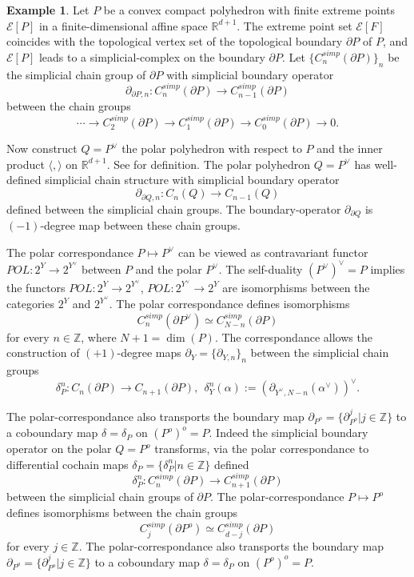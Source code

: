 \documentclass[12pt]{amsart}
\theoremstyle{definition}
\newtheorem{exx}{Example}
\theoremstyle{remark}
\newcommand{\bR}{\mathbb{R}}
\newcommand{\bZ}{\mathbb{Z}}
\newcommand{\del}{\partial}
\newcommand{\sE}{\mathscr{E}}
\begin{document}
\begin{exx}
Let $P$ be a convex compact polyhedron with finite extreme points $\sE[P]$ in a finite-dimensional affine space $\bR^{d+1}$. The extreme point set $\sE[F]$ coincides with the topological vertex set of the topological boundary $\del P$ of $P$, and $\sE[P]$ leads to a simplicial-complex on the boundary $\del P$. Let $\{C_n^{simp}(\del P)\}_n$ be the simplicial chain group of $\del P$ with simplicial boundary operator $$\del_{\del P,n}: C_n^{simp}(\del P) \to C_{n-1}^{simp}(\del P)$$ between the chain groups $$\cdots \to C_2^{simp}(\del P) \to C_1^{simp}(\del P) \to C_0^{simp}(\del P) \to 0.$$ 

Now construct $Q=P^\vee$ the polar polyhedron with respect to $P$ and the inner product $\langle, \rangle$ on $\bR^{d+1}$. See \cite[\S 1.5.4, pp.45-49]{Alexandrov} for definition. The polar polyhedron $Q=P^\vee$ has well-defined simplicial chain structure with simplicial boundary operator $$\del_{\del Q,n}:C_n(Q) \to C_{n-1}(Q)$$ defined between the simplicial chain groups. The boundary-operator $\del_{\del Q}$ is $(-1)$-degree map between these chain groups. 

The polar correspondance $P\mapsto P^\vee$ can be viewed as contravariant functor $POL: 2^Y \to 2^{Y^\vee}$ between $P$ and the polar $P^\vee$. The self-duality $(P^\vee)^\vee=P$ implies the functors $POL: 2^Y \to 2^{Y^\vee}$, $POL: 2^{Y^\vee} \to 2^Y$ are isomorphisms between the categories $2^Y$ and $2^{Y^\vee}$. The polar correspondance defines isomorphisms $$C_n^{simp}(\del P^{\vee}) \simeq C_{N-n}^{simp}(\del P)$$ for every $n\in \bZ$, where $N+1=\dim(P)$. The correspondance allows the construction of $(+1)$-degree maps $\del_Y=\{\del_{Y,n}\}_n$ between the simplicial chain groups \begin{equation} \delta^n_P: C_n(\del P) \to C_{n+1}(\del P), ~~\delta^n_Y(\alpha):=(\del_{Y^\vee, N-n} (\alpha^\vee))^\vee. \label{dualdel}
\end{equation} 

\end{exx}






The polar-correspondance also transports the boundary map $\del_{P^o}=\{\del^j_{P^o}|j\in \bZ\}$ to a coboundary map $\delta=\delta_P$ on $(P^o)^o=P$. Indeed the simplicial boundary operator on the polar $Q=P^{o}$ transforms, via the polar correspondance to differential cochain maps $\delta_P=\{\delta_P^n|n\in \bZ\}$ defined $$\delta^n_P: C_n^{simp}(\del P) \to C_{n+1}^{simp}(\del P)$$ between the simplicial chain groups of $\del P$. The polar-correspondance $P \mapsto P^{o}$ defines isomorphisms between the chain groups $$C_j^{simp}(\del P^{o}) \simeq C_{d-j}^{simp}(\del P)$$ for every $j\in \bZ$. The polar-correspondance also transports the boundary map $\del_{P^o}=\{\del^j_{P^o}|j\in \bZ\}$ to a coboundary map $\delta=\delta_P$ on $(P^o)^o=P$. 
\end{document}
